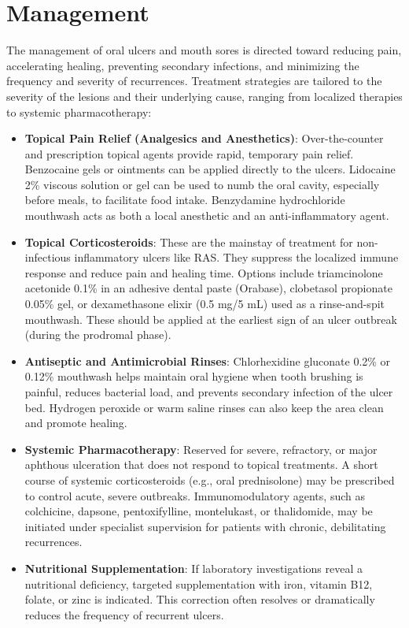 \section*{Management}
The management of oral ulcers and mouth sores is directed toward reducing pain, accelerating healing, preventing secondary infections, and minimizing the frequency and severity of recurrences. Treatment strategies are tailored to the severity of the lesions and their underlying cause, ranging from localized therapies to systemic pharmacotherapy:
\begin{itemize}
    \item \textbf{Topical Pain Relief (Analgesics and Anesthetics)}: Over-the-counter and prescription topical agents provide rapid, temporary pain relief. Benzocaine gels or ointments can be applied directly to the ulcers. Lidocaine 2\% viscous solution or gel can be used to numb the oral cavity, especially before meals, to facilitate food intake. Benzydamine hydrochloride mouthwash acts as both a local anesthetic and an anti-inflammatory agent.
    \item \textbf{Topical Corticosteroids}: These are the mainstay of treatment for non-infectious inflammatory ulcers like RAS. They suppress the localized immune response and reduce pain and healing time. Options include triamcinolone acetonide 0.1\% in an adhesive dental paste (Orabase), clobetasol propionate 0.05\% gel, or dexamethasone elixir (0.5 mg/5 mL) used as a rinse-and-spit mouthwash. These should be applied at the earliest sign of an ulcer outbreak (during the prodromal phase).
    \item \textbf{Antiseptic and Antimicrobial Rinses}: Chlorhexidine gluconate 0.2\% or 0.12\% mouthwash helps maintain oral hygiene when tooth brushing is painful, reduces bacterial load, and prevents secondary infection of the ulcer bed. Hydrogen peroxide or warm saline rinses can also keep the area clean and promote healing.
    \item \textbf{Systemic Pharmacotherapy}: Reserved for severe, refractory, or major aphthous ulceration that does not respond to topical treatments. A short course of systemic corticosteroids (e.g., oral prednisolone) may be prescribed to control acute, severe outbreaks. Immunomodulatory agents, such as colchicine, dapsone, pentoxifylline, montelukast, or thalidomide, may be initiated under specialist supervision for patients with chronic, debilitating recurrences.
    \item \textbf{Nutritional Supplementation}: If laboratory investigations reveal a nutritional deficiency, targeted supplementation with iron, vitamin B12, folate, or zinc is indicated. This correction often resolves or dramatically reduces the frequency of recurrent ulcers.

\end{itemize}
